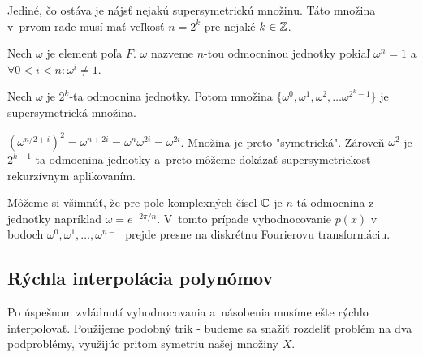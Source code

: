 Jediné, čo ostáva je nájsť nejakú supersymetrickú množinu. Táto
množina v~prvom rade musí mať veľkosť $n=2^k$ pre nejaké $k\in\mathbb{Z}$.

\begin{definicia}
  Nech $\omega$ je element poľa $F$. $\omega$ nazveme $n$-tou
  odmocninou jednotky pokiaľ
   $ \omega^n = 1$ a $ \forall 0<i<n: \omega^i\not=1$.
\end{definicia}

\begin{lema}
 Nech $\omega$ je $2^k$-ta odmocnina jednotky.
 Potom množina $\{\omega^0, \omega^1, \omega^2, \dots
 \omega^{2^k-1}\}$ je supersymetrická množina.
\end{lema}
\begin{dokaz}
 $(\omega^{n/2+i})^2 = \omega^{n+2i} = \omega^n \omega^{2i} =
 \omega^{2i}$. Množina je preto "symetrická". Zároveň
 $\omega^2$ je  $2^{k-1}$-ta odmocnina jednotky a~preto
 môžeme dokázať supersymetrickosť rekurzívnym aplikovaním.
\end{dokaz}

\begin{poznamka}
    Môžeme si všimnúť, že pre pole komplexných čísel $\mathbb{C}$ je $n$-tá
    odmocnina z jednotky napríklad $\omega=e^{-2\pi/n}$. V~tomto prípade
    vyhodnocovanie $p(x)$ v bodoch $\omega^0, \omega^1, \dots,
    \omega^{n-1}$
    prejde presne na diskrétnu Fourierovu
    transformáciu.
\end{poznamka}

\subsection{Rýchla interpolácia polynómov}
Po úspešnom zvládnutí vyhodnocovania a~násobenia musíme ešte rýchlo
interpolovať. Použijeme podobný trik - budeme sa snažiť rozdeliť
problém na dva podproblémy, využijúc pritom symetriu našej množiny $X$.

